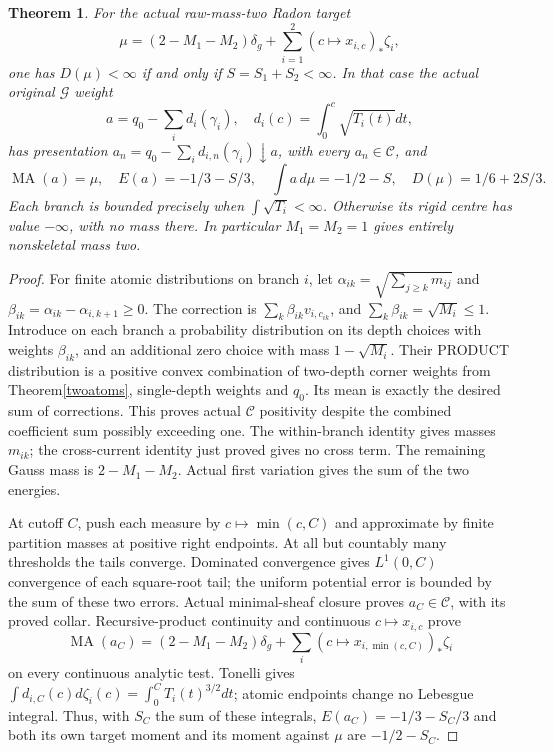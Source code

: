 \documentclass[11pt]{article}
\newtheorem{theorem}{Theorem}
\newcommand{\MA}{\operatorname{MA}}
\newcommand{\C}{\mathcal C}
\newcommand{\G}{\mathcal G}
\begin{document}
\begin{theorem}\label{radon}
For the actual raw-mass-two Radon target
\[
 \mu=(2-M_1-M_2)\delta_g+\sum_{i=1}^2(c\mapsto x_{i,c})_*\zeta_i,
\]
one has $D(\mu)<\infty$ if and only if $S=S_1+S_2<\infty$.
In that case the actual original $\G$ weight
\[
 a=q_0-\sum_i d_i(\gamma_i),\quad
 d_i(c)=\int_0^c\sqrt{T_i(t)}dt,
\]
has presentation $a_n=q_0-\sum_i d_{i,n}(\gamma_i)\downarrow a$,
with every $a_n\in\C$, and
\[
 \MA(a)=\mu,\quad E(a)=-1/3-S/3,\quad
 \int a\,d\mu=-1/2-S,\quad D(\mu)=1/6+2S/3.
\]
Each branch is bounded precisely when $\int\sqrt{T_i}<\infty$.
Otherwise its rigid centre has value $-\infty$, with no mass there.
In particular $M_1=M_2=1$ gives entirely nonskeletal mass two.
\end{theorem}
\begin{proof}
For finite atomic distributions on branch $i$, let
$\alpha_{ik}=\sqrt{\sum_{j\ge k}m_{ij}}$ and
$\beta_{ik}=\alpha_{ik}-\alpha_{i,k+1}\ge0$.
The correction is $\sum_k\beta_{ik}v_{i,c_{ik}}$, and
$\sum_k\beta_{ik}=\sqrt{M_i}\le1$.
Introduce on each branch a probability distribution on its depth choices
with weights $\beta_{ik}$, and an additional zero choice with mass
$1-\sqrt{M_i}$. Their PRODUCT distribution is a positive convex
combination of two-depth corner weights from Theorem\ref{twoatoms},
single-depth weights and $q_0$. Its mean is exactly the desired sum of
corrections. This proves actual $\C$ positivity despite the combined
coefficient sum possibly exceeding one.
The within-branch identity gives masses $m_{ik}$; the cross-current
identity just proved gives no cross term. The remaining Gauss mass is
$2-M_1-M_2$. Actual first variation gives the sum of the two energies.

At cutoff $C$, push each measure by $c\mapsto\min(c,C)$ and approximate
by finite partition masses at positive right endpoints. At all but
countably many thresholds the tails converge. Dominated convergence
gives $L^1(0,C)$ convergence of each square-root tail; the uniform
potential error is bounded by the sum of these two errors.
Actual minimal-sheaf closure proves $a_C\in\C$, with its proved collar.
Recursive-product continuity and continuous $c\mapsto x_{i,c}$ prove
\[
 \MA(a_C)=(2-M_1-M_2)\delta_g+
            \sum_i(c\mapsto x_{i,\min(c,C)})_*\zeta_i
\]
on every continuous analytic test. Tonelli gives
$\int d_{i,C}(c)d\zeta_i(c)=\int_0^C T_i(t)^{3/2}dt$;
atomic endpoints change no Lebesgue integral. Thus, with $S_C$ the sum
of these integrals, $E(a_C)=-1/3-S_C/3$ and both its own target moment
and its moment against $\mu$ are $-1/2-S_C$.


\end{proof}
\end{document}
